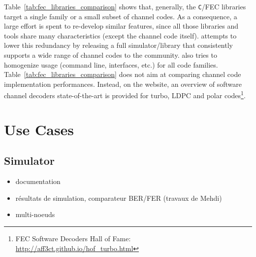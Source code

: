 Table~\ref{tab:fec_libraries_comparison} shows that, generally, the
\verb|C|/\Cxx FEC libraries target a single family or a small subset of channel
codes. As a consequence, a large effort is spent to re-develop similar features,
since all those libraries and tools share many characteristics (except the
channel code itself). \AFFECT attempts to lower this redundancy by releasing a
full simulator/library that consistently supports a wide range of channel codes
to the community. \AFFECT also tries to homogenize usage (command line, \Cxx
interfaces, etc.) for all code families.
Table~\ref{tab:fec_libraries_comparison} does not aim at comparing channel code
implementation performances. Instead, on the \AFFECT website, an overview of
software channel decoders state-of-the-art is provided for turbo, LDPC and polar
codes\footnote{FEC Software Decoders Hall of Fame: \url{http://aff3ct.github.io/hof_turbo.html}}.

\section{Use Cases}

\subsection{Simulator~\cite{Cassagne2017,Cassagne2017a}}

\begin{itemize}
  \item documentation
  \item résultats de simulation, comparateur BER/FER (travaux de Mehdi)
  \item multi-noeuds
\end{itemize}

